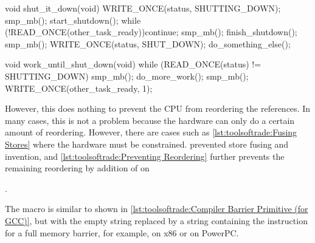 \begin{listing}
\begin{fcvlabel}
\begin{VerbatimL}[commandchars=\\\[\]]
void shut_it_down(void)
{
	WRITE_ONCE(status, SHUTTING_DOWN);
	smp_mb(); \lnlbl[mb1]
	start_shutdown();
	while (!READ_ONCE(other_task_ready))\lnlbl[loop:b]
		continue;
	smp_mb(); \lnlbl[mb2]
	finish_shutdown();
	smp_mb(); \lnlbl[mb3]
	WRITE_ONCE(status, SHUT_DOWN);
	do_something_else();
}

void work_until_shut_down(void)
{
	while (READ_ONCE(status) != SHUTTING_DOWN) {
		smp_mb(); \lnlbl[mb4]
		do_more_work();
	}
	smp_mb(); \lnlbl[mb5]
	WRITE_ONCE(other_task_ready, 1);
}
\end{VerbatimL}
\end{fcvlabel}
\caption{Preventing Reordering}
\label{lst:toolsoftrade:Preventing Reordering}
\end{listing}

However, this does nothing to prevent the CPU from reordering the
references.
In many cases, this is not a problem because the hardware can only do
a certain amount of reordering.
However, there are cases such as
\cref{lst:toolsoftrade:Fusing Stores} where the
hardware must be constrained.
prevented store fusing and invention, and
\cref{lst:toolsoftrade:Preventing Reordering}
further prevents the remaining reordering by addition of
 on
\begin{fcvref}
.
\end{fcvref}
The  macro is similar to  shown in
\cref{lst:toolsoftrade:Compiler Barrier Primitive (for GCC)},
but with the empty string replaced by a string containing the
instruction for a full memory barrier, for example, 
on x86 or  on PowerPC.

\QuickQuizEnd


